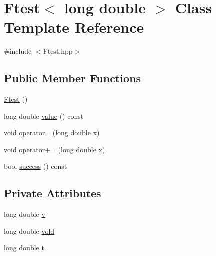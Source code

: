 \hypertarget{classFtest_3_01long_01double_01_4}{\section{Ftest$<$ long double $>$ Class Template Reference}
\label{classFtest_3_01long_01double_01_4}
}


{\ttfamily \#include $<$Ftest.\-hpp$>$}

\subsection*{Public Member Functions}
\begin{DoxyCompactItemize}
\item 
\hyperlink{classFtest_3_01long_01double_01_4_ad92bdfec0e10fb2e71a5c099235b0537}{Ftest} ()
\item 
long double \hyperlink{classFtest_3_01long_01double_01_4_a8f637e0e4b859dd71a1a238ee49076bf}{value} () const 
\item 
void \hyperlink{classFtest_3_01long_01double_01_4_a084a6f219e2bccec5efc0e14d81bd31c}{operator=} (long double x)
\item 
void \hyperlink{classFtest_3_01long_01double_01_4_aa695b7c2508c61127eb339cd33c5b012}{operator+=} (long double x)
\item 
bool \hyperlink{classFtest_3_01long_01double_01_4_aa475b2024bdf479158b9c5661e750f3c}{success} () const 
\end{DoxyCompactItemize}
\subsection*{Private Attributes}
\begin{DoxyCompactItemize}
\item 
long double \hyperlink{classFtest_3_01long_01double_01_4_add124f0929ff5928816dcf8b99ceff7a}{v}
\item 
long double \hyperlink{classFtest_3_01long_01double_01_4_aa9c7914bf4f6ab45bee8a51c683907c0}{vold}
\item 
long double \hyperlink{classFtest_3_01long_01double_01_4_a9954182303988bdc3e7e02e7cab252bf}{t}
\end{DoxyCompactItemize}


